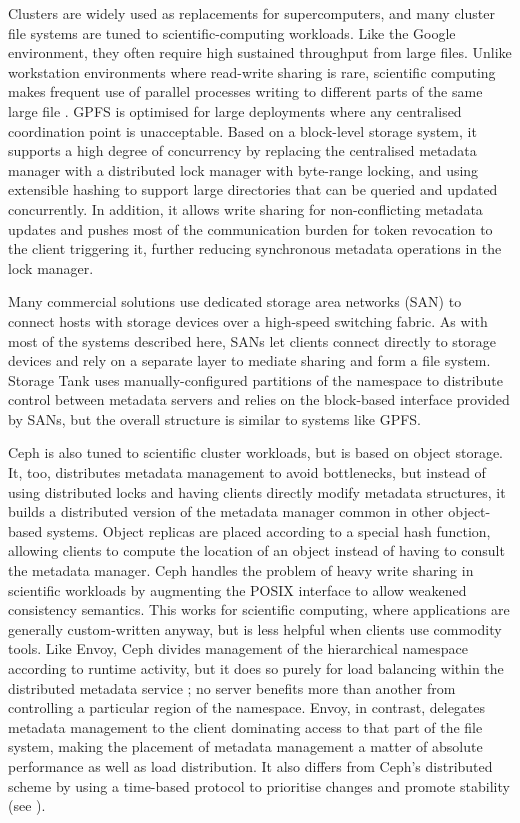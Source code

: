 Clusters are widely used as replacements for supercomputers, and many cluster file systems are tuned to scientific-computing workloads. Like the Google environment, they often require high sustained throughput from large files. Unlike workstation environments where read-write sharing is rare, scientific computing makes frequent use of parallel processes writing to different parts of the same large file \cite{wang04}. GPFS \cite{schmuck} is optimised for large deployments where any centralised coordination point is unacceptable. Based on a block-level storage system, it supports a high degree of concurrency by replacing the centralised metadata manager with a distributed lock manager with byte-range locking, and using extensible hashing to support large directories that can be queried and updated concurrently. In addition, it allows write sharing for non-conflicting metadata updates and pushes most of the communication burden for token revocation to the client triggering it, further reducing synchronous metadata operations in the lock manager.

Many commercial solutions use dedicated storage area networks (SAN) to connect hosts with storage devices over a high-speed switching fabric. As with most of the systems described here, SANs let clients connect directly to storage devices and rely on a separate layer to mediate sharing and form a file system. Storage Tank \cite{menon} uses manually-configured partitions of the namespace to distribute control between metadata servers and relies on the block-based interface provided by SANs, but the overall structure is similar to systems like GPFS.

Ceph \cite{weil06} is also tuned to scientific cluster workloads, but is based on object storage. It, too, distributes metadata management to avoid bottlenecks, but instead of using distributed locks and having clients directly modify metadata structures, it builds a distributed version of the metadata manager common in other object-based systems. Object replicas are placed according to a special hash function, allowing clients to compute the location of an object instead of having to consult the metadata manager. Ceph handles the problem of heavy write sharing in scientific workloads by augmenting the POSIX interface to allow weakened consistency semantics. This works for scientific computing, where applications are generally custom-written anyway, but is less helpful when clients use commodity tools. Like Envoy, Ceph divides management of the hierarchical namespace according to runtime activity, but it does so purely for load balancing within the distributed metadata service \cite{weil04}; no server benefits more than another from controlling a particular region of the namespace. Envoy, in contrast, delegates metadata management to the client dominating access to that part of the file system, making the placement of metadata management a matter of absolute performance as well as load distribution. It also differs from Ceph's distributed scheme by using a time-based protocol to prioritise changes and promote stability (see ).

